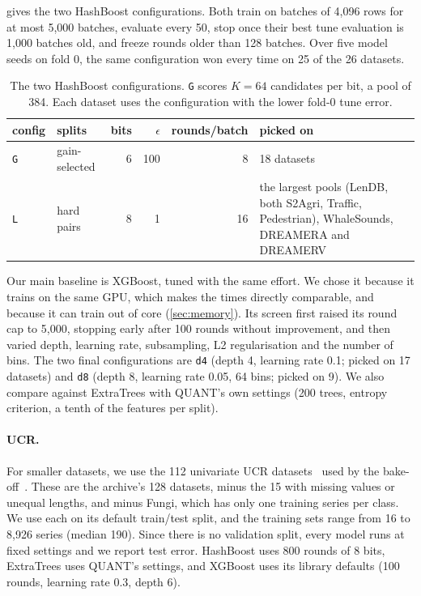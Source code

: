 \documentclass[a4paper, 11pt]{article}
\newcommand{\code}[1]{\texttt{#1}}
\begin{document}
 gives the two HashBoost configurations. Both train on
batches of 4,096 rows for at most 5,000 batches, evaluate every 50, stop once
their best tune evaluation is 1,000 batches old, and freeze rounds older than
128 batches. Over five model seeds on fold 0, the same configuration won
every time on 25 of the 26 datasets.

\begin{table}[tbp]
    \centering
    \small
    \caption{The two HashBoost configurations. \code{G} scores $K = 64$
        candidates per bit, a pool of 384. Each dataset uses the configuration
        with the lower fold-0 tune error.}
    \label{tab:configs}
    \begin{tabular}{llrrrp{6cm}}
        \toprule
        config   & splits        & bits & $\epsilon$ & rounds/batch & picked on \\
        \midrule
        \code{G} & gain-selected & 6    & 100        & 8            & 18 datasets \\
        \code{L} & hard pairs    & 8    & 1          & 16           & the largest pools (LenDB, both S2Agri, Traffic,
        Pedestrian), WhaleSounds, DREAMERA and DREAMERV \\
        \bottomrule
    \end{tabular}
\end{table}

Our main baseline is XGBoost, tuned with the same effort. We chose it because
it trains on the same GPU, which makes the times directly comparable, and
because it can train out of core (\cref{sec:memory}). Its screen first raised
its round cap to 5,000, stopping early after 100 rounds without improvement,
and then varied depth, learning rate, subsampling, L2 regularisation and the
number of bins. The two
final configurations are \code{d4} (depth 4, learning rate 0.1; picked on 17
datasets) and \code{d8} (depth 8, learning rate 0.05, 64 bins; picked on 9).
We also compare against ExtraTrees with QUANT's own settings (200 trees,
entropy criterion, a tenth of the features per split).

\paragraph{UCR.}
For smaller datasets, we use the 112 univariate UCR
datasets~\cite{dau2019ucr} used by the
bake-off~\cite{middlehurst2024bakeoff}. These are the archive's 128 datasets,
minus the 15 with missing values or unequal lengths, and minus Fungi, which
has only one training series per class. We use each on its default
train/test split, and the training sets range from 16 to 8,926 series
(median 190). Since there is no validation split, every model runs at fixed
settings and we report test error. HashBoost uses 800 rounds of 8 bits,
ExtraTrees uses QUANT's settings, and XGBoost uses its library defaults (100
rounds, learning rate 0.3, depth 6).
\end{document}
